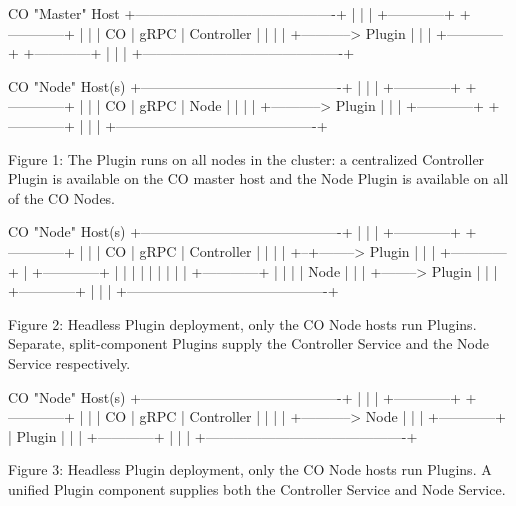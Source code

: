 \documentclass[12pt]{article}
\begin{document}
\begin{bashcode}
                             CO "Master" Host
+-------------------------------------------+
|                                           |
|  +------------+           +------------+  |
|  |     CO     |   gRPC    | Controller |  |
|  |            +----------->   Plugin   |  |
|  +------------+           +------------+  |
|                                           |
+-------------------------------------------+

                            CO "Node" Host(s)
+-------------------------------------------+
|                                           |
|  +------------+           +------------+  |
|  |     CO     |   gRPC    |    Node    |  |
|  |            +----------->   Plugin   |  |
|  +------------+           +------------+  |
|                                           |
+-------------------------------------------+

Figure 1: The Plugin runs on all nodes in the cluster: a centralized
Controller Plugin is available on the CO master host and the Node
Plugin is available on all of the CO Nodes.
\end{bashcode}

\begin{bashcode}
                            CO "Node" Host(s)
+-------------------------------------------+
|                                           |
|  +------------+           +------------+  |
|  |     CO     |   gRPC    | Controller |  |
|  |            +--+-------->   Plugin   |  |
|  +------------+  |        +------------+  |
|                  |                        |
|                  |                        |
|                  |        +------------+  |
|                  |        |    Node    |  |
|                  +-------->   Plugin   |  |
|                           +------------+  |
|                                           |
+-------------------------------------------+

Figure 2: Headless Plugin deployment, only the CO Node hosts run
Plugins. Separate, split-component Plugins supply the Controller
Service and the Node Service respectively.
\end{bashcode}


\begin{bashcode}
                            CO "Node" Host(s)
+-------------------------------------------+
|                                           |
|  +------------+           +------------+  |
|  |     CO     |   gRPC    | Controller |  |
|  |            +----------->    Node    |  |
|  +------------+           |   Plugin   |  |
|                           +------------+  |
|                                           |
+-------------------------------------------+

Figure 3: Headless Plugin deployment, only the CO Node hosts run
Plugins. A unified Plugin component supplies both the Controller
Service and Node Service.
\end{bashcode}
\end{document}
